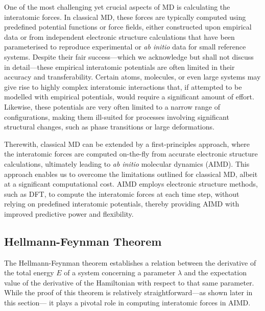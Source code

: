 One of the most challenging yet crucial aspects of MD is calculating the interatomic forces. In classical MD, these forces are typically computed using predefined potential functions or force fields, either constructed upon empirical data or from independent electronic structure calculations that have been parameterised to reproduce experimental or \emph{ab initio} data for small reference systems. Despite their fair success---which we acknowledge but shall not discuss in detail---these empirical interatomic potentials are often limited in their accuracy and transferability. Certain atoms, molecules, or even large systems may give rise to highly complex interatomic interactions that, if attempted to be modelled with empirical potentials, would require a significant amount of effort. Likewise, these potentials are very often limited to a narrow range of configurations, making them ill-suited for processes involving significant structural changes, such as phase transitions or large deformations.  

Therewith, classical MD can be extended by a first-principles approach, where the interatomic forces are computed on-the-fly from accurate electronic structure calculations, ultimately leading to \emph{ab initio} molecular dynamics (AIMD). This approach enables us to overcome the limitations outlined for classical MD, albeit at a significant computational cost. AIMD employs electronic structure methods, such as DFT, to compute the interatomic forces at each time step, without relying on predefined interatomic potentials, thereby providing AIMD with improved predictive power and flexibility.  


\subsection{Hellmann-Feynman Theorem}
 The Hellmann-Feynman theorem\supercite{Feynman1939, Politzer2018} establishes a relation between the derivative of the total energy $E$ of a system concerning a parameter $\lambda$ and the expectation value of the derivative of the Hamiltonian with respect to that same parameter.
 While the proof of this theorem is relatively straightforward---as shown later in this section---
 it plays a pivotal role in computing interatomic forces in AIMD. 
 
